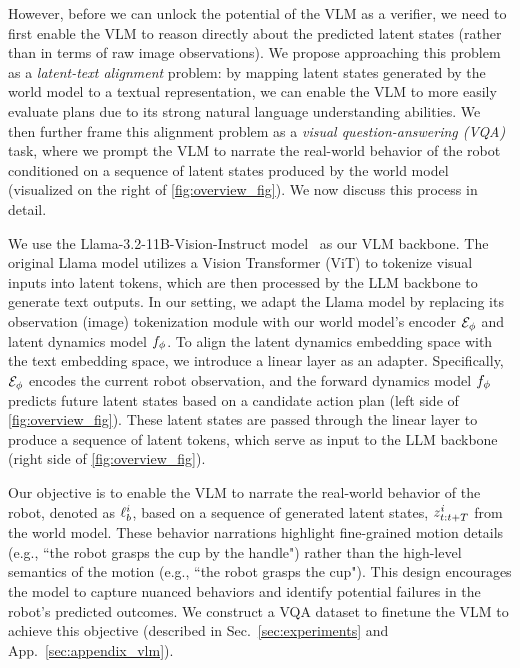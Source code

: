 However, before we can unlock the potential of the VLM as a verifier, we need to first enable the VLM to reason directly about the predicted latent states (rather than in terms of raw image observations). We propose approaching this problem as a \textit{latent-text alignment} problem: by mapping latent states generated by the world model to a textual representation, we can enable the VLM to more easily evaluate plans due to its strong natural language understanding abilities. 
We then further frame this alignment problem as a \textit{visual question-answering (VQA)} task, where we prompt the VLM to narrate the real-world behavior of the robot conditioned on a sequence of latent states produced by the world model (visualized on the right of \autoref{fig:overview_fig}). We now discuss this process in detail.





\label{para:vlm model}
We use the Llama-3.2-11B-Vision-Instruct model~\citep{dubey2024llama} as our VLM backbone. The original Llama model %
utilizes a Vision Transformer (ViT) to tokenize visual inputs into latent tokens, which are then processed by the LLM backbone to generate text outputs.
In our setting, we adapt the Llama model by replacing its observation (image) tokenization module with our world model’s encoder $\mathcal{E}_\phi$ and latent dynamics model $f_\phi$. To align the latent dynamics embedding space with the text embedding space, we introduce a linear layer as an adapter. 
Specifically, $\mathcal{E}_\phi$ encodes the current robot observation, and the forward dynamics model $f_\phi$ predicts future latent states based on a candidate action plan (left side of \autoref{fig:overview_fig}). These latent states are passed through the linear layer to produce a sequence of latent tokens, which serve as input to the LLM backbone (right side of \autoref{fig:overview_fig}).






 Our objective is to enable the VLM to narrate the real-world behavior of the robot, denoted as $\ell_b^i$, based on a sequence of generated latent states, $z^i_{t:t+T}$ from the world model. These behavior narrations highlight fine-grained motion details (e.g., ``the robot grasps the cup by the handle") rather than the high-level semantics of the motion (e.g., ``the robot grasps the cup"). This design encourages the model to capture nuanced behaviors and identify potential failures in the robot’s predicted outcomes. We construct a VQA dataset to finetune the VLM to achieve this objective (described in Sec.~\ref{sec:experiments} and App.~\ref{sec:appendix_vlm}). 


















